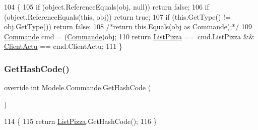 \begin{DoxyCode}
104         \{
105             \textcolor{keywordflow}{if} (\textcolor{keywordtype}{object}.ReferenceEquals(obj, null)) \textcolor{keywordflow}{return} \textcolor{keyword}{false};
106             \textcolor{keywordflow}{if} (\textcolor{keywordtype}{object}.ReferenceEquals(\textcolor{keyword}{this}, obj)) \textcolor{keywordflow}{return} \textcolor{keyword}{true};
107             \textcolor{keywordflow}{if} (this.GetType() != obj.GetType()) \textcolor{keywordflow}{return} \textcolor{keyword}{false};
108             \textcolor{comment}{/*return this.Equals(obj as Commande);*/}
109             \hyperlink{classModele_1_1Commande_a998dd9a12105bc2fe0f78764a8eb2306}{Commande} cmd = (\hyperlink{classModele_1_1Commande_a998dd9a12105bc2fe0f78764a8eb2306}{Commande})obj;
110             \textcolor{keywordflow}{return} \hyperlink{classModele_1_1Commande_a296c71bf31f1e6383e63d842ceb0bfe6}{ListPizza} == cmd.ListPizza && \hyperlink{classModele_1_1Commande_ad9f1418f7febfa94bcb57873d3ac6be4}{ClientActu} == cmd.ClientActu;
111         \}
\end{DoxyCode}
\mbox{\label{classModele_1_1Commande_a1e9a7e7bd98ad29127d0a228378568be}} 
\subsubsection{\texorpdfstring{Get\+Hash\+Code()}{GetHashCode()}}
{\footnotesize\ttfamily override int Modele.\+Commande.\+Get\+Hash\+Code (\begin{DoxyParamCaption}{ }\end{DoxyParamCaption})\hspace{0.3cm}{\ttfamily [inline]}}


\begin{DoxyCode}
114         \{
115             \textcolor{keywordflow}{return} \hyperlink{classModele_1_1Commande_a296c71bf31f1e6383e63d842ceb0bfe6}{ListPizza}.GetHashCode();
116         \}
\end{DoxyCode}
\mbox{\label{classModele_1_1Commande_a81e35543bb9d8de1b01f8dd4ba0d3f38}} 
